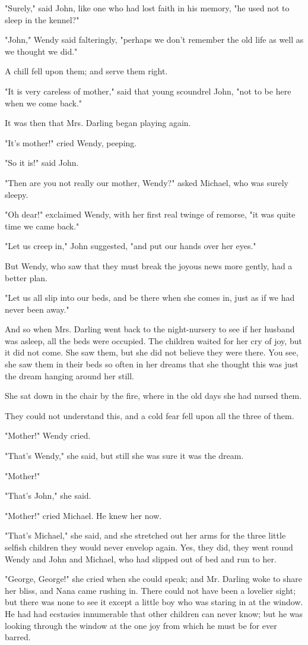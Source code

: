 "Surely," said John, like one who had lost faith in his memory, "he used
not to sleep in the kennel?"


"John," Wendy said falteringly, "perhaps we don't remember the old life as
well as we thought we did."


A chill fell upon them; and serve them right.


"It is very careless of mother," said that young scoundrel John, "not to
be here when we come back."


It was then that Mrs. Darling began playing again.


"It's mother!" cried Wendy, peeping.


"So it is!" said John.


"Then are you not really our mother, Wendy?" asked Michael, who was surely
sleepy.


"Oh dear!" exclaimed Wendy, with her first real twinge of remorse,
"it was quite time we came back."


"Let us creep in," John suggested, "and put our hands over her eyes."


But Wendy, who saw that they must break the joyous news more gently, had a
better plan.


"Let us all slip into our beds, and be there when she comes in, just as if
we had never been away."


And so when Mrs. Darling went back to the night-nursery to see if her
husband was asleep, all the beds were occupied. The children waited for
her cry of joy, but it did not come. She saw them, but she did not believe
they were there. You see, she saw them in their beds so often in her
dreams that she thought this was just the dream hanging around her still.


She sat down in the chair by the fire, where in the old days she had
nursed them.


They could not understand this, and a cold fear fell upon all the three of
them.


"Mother!" Wendy cried.


"That's Wendy," she said, but still she was sure it was the dream.


"Mother!"


"That's John," she said.


"Mother!" cried Michael. He knew her now.


"That's Michael," she said, and she stretched out her arms for the three
little selfish children they would never envelop again. Yes, they did,
they went round Wendy and John and Michael, who had slipped out of bed and
run to her.


"George, George!" she cried when she could speak; and Mr. Darling woke to
share her bliss, and Nana came rushing in. There could not have been a
lovelier sight; but there was none to see it except a little boy who was
staring in at the window. He had had ecstasies innumerable that other
children can never know; but he was looking through the window at the one
joy from which he must be for ever barred.

